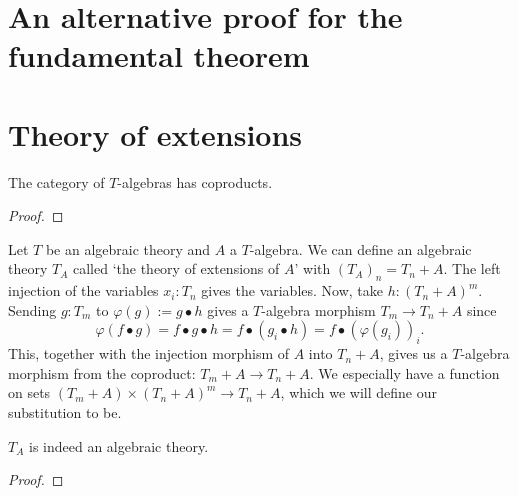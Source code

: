 \section{An alternative proof for the fundamental theorem}

\section{Theory of extensions}

\begin{lemma}
  The category of $ T $-algebras has coproducts.
\end{lemma}
\begin{proof}
  \TODO
\end{proof}

\begin{definition}
  Let $ T $ be an algebraic theory and $ A $ a $ T $-algebra. We can define an algebraic theory $ T_A $ called `the theory of extensions of $ A $' with $ (T_A)_n = T_n + A $. The left injection of the variables $ x_i : T_n $ gives the variables.
  Now, take $ h: (T_n + A)^m $. Sending $ g: T_m $ to $ \varphi(g) := g \bullet h $ gives a $ T $-algebra morphism $ T_m \to T_n + A $ since
  \[ \varphi(f \bullet g) = f \bullet g \bullet h = f \bullet (g_i \bullet h) = f \bullet (\varphi(g_i))_i. \]
  This, together with the injection morphism of $ A $ into $ T_n + A $, gives us a $ T $-algebra morphism from the coproduct: $ T_m + A \to T_n + A $. We especially have a function on sets $ (T_m + A) \times (T_n + A)^m \to T_n + A $, which we will define our substitution to be.
\end{definition}

\begin{lemma}
  $ T_A $ is indeed an algebraic theory.
\end{lemma}
\begin{proof}
  \TODO
\end{proof}
